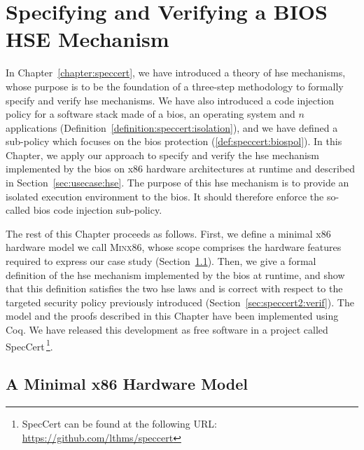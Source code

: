 \chapter{Specifying and Verifying a BIOS HSE Mechanism}
\label{chapter:speccert2}


\vspace{1cm}%
\noindent
%
In Chapter~\ref{chapter:speccert}, we have introduced a theory of \ac{hse}
mechanisms, whose purpose is to be the foundation of a three-step methodology to
formally specify and verify \ac{hse} mechanisms.
%
We have also introduced a code injection policy for a software stack made of a
\ac{bios}, an operating system and \( n \) applications
(Definition~\ref{definition:speccert:isolation}), and we have defined a
sub-policy which focuses on the \ac{bios} protection
(\ref{def:speccert:biospol}).
%
In this Chapter, we apply our approach to specify and verify the \ac{hse}
mechanism implemented by the \ac{bios} on x86 hardware architectures at runtime
and described in Section~\ref{sec:usecase:hse}.
%
The purpose of this \ac{hse} mechanism is to provide an isolated execution
environment to the \ac{bios}. It should therefore enforce the so-called
\ac{bios} code injection sub-policy.

The rest of this Chapter proceeds as follows.
%
First, we define a minimal x86 hardware model we call {\scshape Minx86}, whose
scope comprises the hardware features required to express our case study
(Section~\ref{sec:speccert2:minx86}).
%
Then, we give a formal definition of the \ac{hse} mechanism implemented by the
\ac{bios} at runtime, and show that this definition satisfies the two \ac{hse}
laws and is correct with respect to the targeted security policy previously
introduced (Section~\ref{sec:speccert2:verif}).
%
The model and the proofs described in this Chapter have been implemented using
Coq.
%
We have released this development as free software in a project called
SpecCert\,\footnote{SpecCert can be found at the following URL:
  \url{https://github.com/lthms/speccert}}.

\section{A Minimal x86 Hardware Model}
\label{sec:speccert2:minx86}

